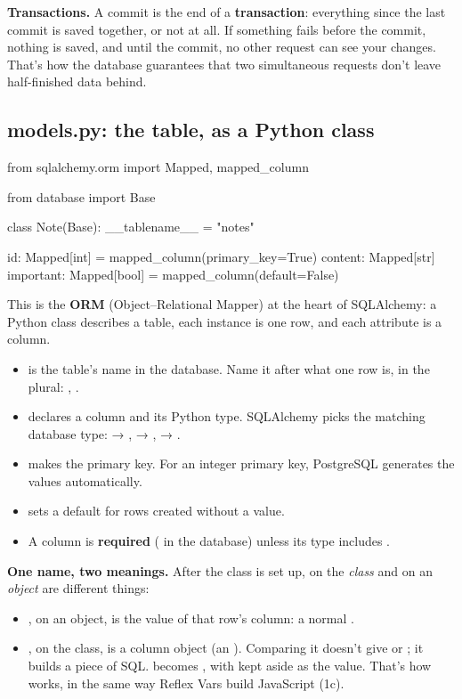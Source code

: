 \textbf{Transactions.} A commit is the end of a \textbf{transaction}: everything since the last commit is saved together, or not at all. If something fails before the commit, nothing is saved, and until the commit, no other request can see your changes. That's how the database guarantees that two simultaneous requests don't leave half-finished data behind.

\subsection{models.py: the table, as a Python class}

\begin{py}
from sqlalchemy.orm import Mapped, mapped_column

from database import Base


class Note(Base):
	__tablename__ = "notes"

	id: Mapped[int] = mapped_column(primary_key=True)
	content: Mapped[str]
	important: Mapped[bool] = mapped_column(default=False)
\end{py}

This is the \textbf{ORM} (Object--Relational Mapper) at the heart of SQLAlchemy: a Python class describes a table, each instance is one row, and each attribute is a column.

\begin{itemize}
\item {} is the table's name in the database. Name it after what one row is, in the plural: , .
\item {} declares a column and its Python type. SQLAlchemy picks the matching database type:  → ,  → ,  → .
\item {} makes  the primary key. For an integer primary key, PostgreSQL generates the values automatically.
\item {} sets a default for rows created without a value.
\item A column is \textbf{required} ( in the database) unless its type includes .
\end{itemize}

\textbf{One name, two meanings.} After the class is set up,  on the \emph{class} and  on an \emph{object} are different things:
\begin{itemize}
\item {}, on an object, is the value of that row's column: a normal .
\item {}, on the class, is a column object (an ). Comparing it doesn't give  or ; it builds a piece of SQL.  becomes , with  kept aside as the value. That's how  works, in the same way Reflex Vars build JavaScript (1c).
\end{itemize}

